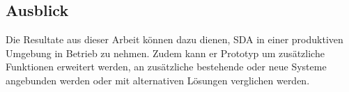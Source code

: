 \subsection{Ausblick}
Die Resultate aus dieser Arbeit können dazu dienen, SDA in einer produktiven Umgebung in Betrieb zu nehmen. Zudem kann er Prototyp um zusätzliche Funktionen erweitert werden, an zusätzliche bestehende oder neue Systeme angebunden werden oder mit alternativen Lösungen verglichen werden.
